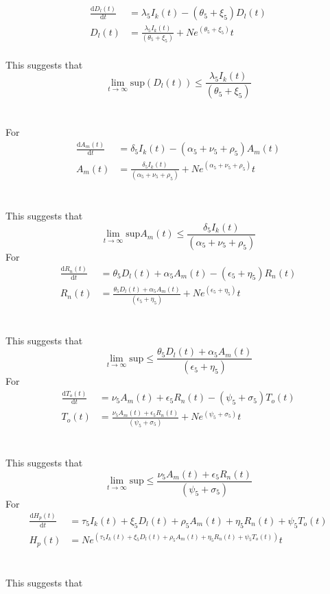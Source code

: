 \documentclass{article}
\begin{document}
\begin{align*}
    \frac{\text{d}D_l(t)}{\text{d}t} &=\lambda_5 I_k(t) -(\theta_5 + \xi_5)D_l(t) \\
    D_l(t)&= \frac{\lambda_5 I_k(t)}{(\theta_5 + \xi_5)} + Ne^{(\theta_5 + \xi_5)}t
\end{align*}\\
This suggests that\\ 
\[ \lim_{t\to\infty} \text{sup}(D_l(t))\leq \frac{\lambda_5 I_k(t)}{(\theta_5 + \xi_5)} \]\\\\
For\\
\begin{align*}
    \frac{\text{d}A_m(t)}{\text{d}t} &= \delta_5 I_k(t) -(\alpha_5 + \nu_5 + \rho_5)A_m(t)\\
    A_m(t) &= \frac{\delta_5 I_k(t)}{(\alpha_5 + \nu_5 + \rho_5)} + Ne^{(\alpha_5 + \nu_5 + \rho_5)}t
\end{align*}\\\\
This suggests that\\

\[ \lim_{t\to\infty} \text{sup}A_m(t) \leq \frac{\delta_5 I_k(t)}{(\alpha_5 + \nu_5 + \rho_5)} \]
 For\\
 \begin{align*}
   \frac{\text{d}R_n(t)}{\text{d}t} &= \theta_5 D_l(t) + \alpha_5 A_m(t) -(\epsilon_5 + \eta_5)R_n(t)\\
   R_n(t) & = \frac{\theta_5 D_l(t) + \alpha_5 A_m(t)}{(\epsilon_5 + \eta_5)} + Ne^{(\epsilon_5 + \eta_5)}t
 \end{align*}\\\\
 This suggests that\\ 

\[ \lim_{t\to\infty} \text{sup} \leq \frac{\theta_5 D_l(t) + \alpha_5 A_m(t)}{(\epsilon_5 + \eta_5)} \]
  For\\
 \begin{align*}
    \frac{\text{d}T_o(t)}{\text{d}t} &= \nu_5 A_m(t) +\epsilon_5 R_n(t) - (\psi_5 + \sigma_5)T_o(t)\\
    T_o(t) &= \frac{\nu_5 A_m(t) +\epsilon_5 R_n(t)}{(\psi_5 + \sigma_5)} + Ne^{(\psi_5 + \sigma_5)}t
 \end{align*}\\\\
 This suggests that\\

\[ \lim_{t\to\infty} \text{sup} \leq \frac{\nu_5 A_m(t) +\epsilon_5 R_n(t)}{(\psi_5 + \sigma_5)} \]
  For\\
 \begin{align*}
     \frac{\text{d}H_p(t)}{\text{d}t} &= \tau_5 I_k(t) + \xi_5 D_l(t) + \rho_5 A_m(t) + \eta_5 R_n(t) + \psi_5 T_o(t)\\
     H_p(t) &= Ne^{(\tau_5 I_k(t) + \xi_5 D_l(t) + \rho_5 A_m(t) + \eta_5 R_n(t) + \psi_5 T_o(t))}t
 \end{align*}\\\\
 This suggests that\\
\end{document}
